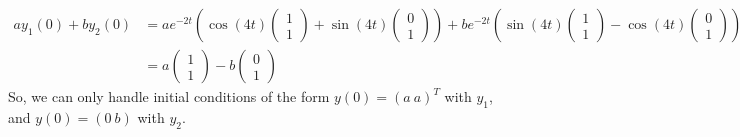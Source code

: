 \documentclass[11pt]{article}
\begin{document}
\begin{align*}a y_1(0) + b y_2(0) &= a e^{-2t} \left(\cos(4t)   \left( \begin{matrix}1 \\ 1\end{matrix}\right) +   \sin(4t) \left( \begin{matrix}0 \\ 1\end{matrix}\right) \right)+ b  e^{-2t} \left(\sin(4t)   \left( \begin{matrix}1 \\ 1\end{matrix}\right) -   \cos(4t) \left( \begin{matrix}0 \\ 1\end{matrix}\right) \right)\\
&= a    \left( \begin{matrix}1 \\ 1\end{matrix}\right) - b  \left( \begin{matrix}0 \\ 1\end{matrix}\right) 
\end{align*}
So, we can only handle initial conditions of the form $y(0) = (a~a)^T$ with $y_1$, and $y(0) = (0~b)$ with $y_2$.
\end{document}
